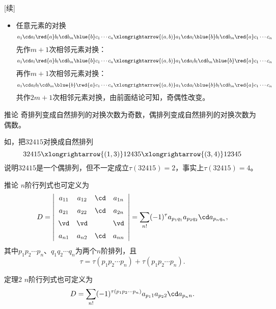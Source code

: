 \begin{frame}
\begin{overprint}
    \proofname[续]
    \begin{itemize}
    \item 任意元素的对换\\[0.2cm]
      $$
      a_1 \cd a_l \red{a}  b_l \cd b_m \blue{b} c_1 \cdots c_n
      \xlongrightarrow{(a,b)}
      a_1 \cd a_l \blue{b}  b_l \cd b_m \red{a} c_1 \cdots c_n
      $$
      先作$m+1$次相邻元素对换：
      $$
      a_1 \cd a_l \red{a}   b_l \cd b_m \blue{b} c_1 \cdots c_n
      \xlongrightarrow{(a,b)}
      a_1 \cd a_l   b_l \cd b_m \blue{b} \red{a}  c_1 \cdots c_n
      $$
      再作$m+1$次相邻元素对换：
      $$
      a_1 \cd a_l   b_l \cd b_m \blue{b} \red{a}  c_1 \cdots c_n
      \xlongrightarrow{(a,b)}
      a_1 \cd a_l \blue{b}  b_l \cd b_m \red{a}  c_1 \cdots c_n
      $$
      共作$2m+1$次相邻元素对换，由前面结论可知，奇偶性改变。
    \end{itemize}


    \begin{block}{推论}
      奇排列变成自然排列的对换次数为奇数，偶排列变成自然排列的对换次数为偶数。
    \end{block}
    \vspace{0.3cm}
    如，把$32415$对换成自然排列
    $$
    32415 \xlongrightarrow{(1,3)} 12435 \xlongrightarrow{(3,4)} 12345
    $$
    说明$32415$是一个偶排列，但不一定成立$\tau(32415)=2$，事实上$\tau(32415)=4$。
    

    \begin{block}{推论}
      $n$阶行列式也可定义为
      $$
      D = \left|
      \begin{array}{ccccc}
        a_{11} & a_{12} & \cd & a_{1n} \\[0.2cm]
        a_{21} & a_{22} & \cd & a_{2n} \\[0.2cm]
        \vd   &  \vd  &     & \vd   \\[0.2cm]
        a_{n1} & a_{n2} & \cd & a_{nn} 
      \end{array}
      \right|
      = \sum_{n!} (-1)^{\tau} a_{p_1q_1}a_{p_2q_2}\cd a_{p_nq_n},
      $$      
      其中$p_1p_2\cdots p_n$、$q_1q_2\cdots q_n$为两个$n$阶排列，且
      $$
      \tau = \tau(p_1p_2\cdots p_n) + \tau(p_1p_2\cdots p_n).
      $$
    \end{block}


    \begin{block}{定理2}
      $n$阶行列式也可定义为
      $$
      D = \sum_{n!} (-1)^{ \tau(p_1p_2\cdots p_n) } a_{p_11}a_{p_22}\cd a_{p_nn}.
      $$      
    \end{block}
    
  \end{overprint}
\end{frame}

